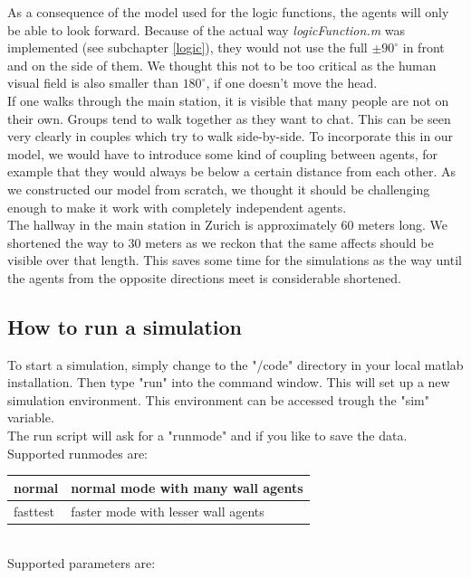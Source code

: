 \noi As a consequence of the model used for the logic functions, the agents will only be able to look forward. Because of the actual way \textit{logicFunction.m} was implemented (see subchapter \ref{logic}), they would not use the full $\pm 90^\circ$ in front and on the side of them. We thought this not to be too critical as the human visual field is also smaller than $180^\circ$, if one doesn't move the head.\\

\noi If one walks through the main station, it is visible that many people are not on their own. Groups tend to walk together as they want to chat. This can be seen very clearly in couples which try to walk side-by-side. To incorporate this in our model, we would have to introduce some kind of coupling between agents, for example that they would always be below a certain distance from each other. As we constructed our model from scratch, we thought it should be challenging enough to make it work with completely independent agents.\\

\noi The hallway in the main station in Zurich is approximately 60 meters long. We shortened the way to 30 meters as we reckon that the same affects should be visible over that length. This saves some time for the simulations as the way until the agents from the opposite directions meet is considerable shortened.

\subsection{How to run a simulation}
To start a simulation, simply change to the "/code" directory in your local matlab installation. Then type "run" into the command window. This will set up a new simulation environment. This environment can be accessed trough the "sim" variable.\\
The run script will ask for a "runmode" and if you like to save the data. Supported runmodes are:\\

\begin{tabular}{|p{3cm}|p{10cm}|}
      \hline
      normal & normal mode with many wall agents\\ \hline
      fasttest & faster mode with lesser wall agents \\ 
      \hline
\end{tabular}\\

\noi Supported parameters are:\\

